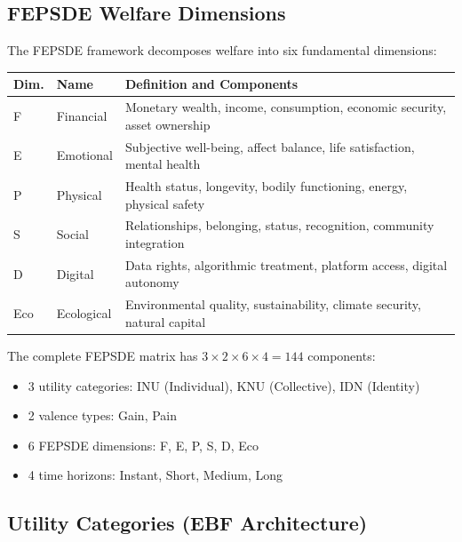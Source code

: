 \subsection{FEPSDE Welfare Dimensions}

The FEPSDE framework decomposes welfare into six fundamental dimensions:

\begin{center}
\renewcommand{\arraystretch}{1.3}
\begin{tabular}{llp{8cm}}
\hline
\textbf{Dim.} & \textbf{Name} & \textbf{Definition and Components} \\
\hline
F & Financial & Monetary wealth, income, consumption, economic security, asset ownership \\
E & Emotional & Subjective well-being, affect balance, life satisfaction, mental health \\
P & Physical & Health status, longevity, bodily functioning, energy, physical safety \\
S & Social & Relationships, belonging, status, recognition, community integration \\
D & Digital & Data rights, algorithmic treatment, platform access, digital autonomy \\
Eco & Ecological & Environmental quality, sustainability, climate security, natural capital \\
\hline
\end{tabular}
\end{center}

The complete FEPSDE matrix has $3 \times 2 \times 6 \times 4 = 144$ components:
\begin{itemize}
    \item 3 utility categories: INU (Individual), KNU (Collective), IDN (Identity)
    \item 2 valence types: Gain, Pain
    \item 6 FEPSDE dimensions: F, E, P, S, D, Eco
    \item 4 time horizons: Instant, Short, Medium, Long
\end{itemize}

\subsection{Utility Categories (EBF Architecture)}

